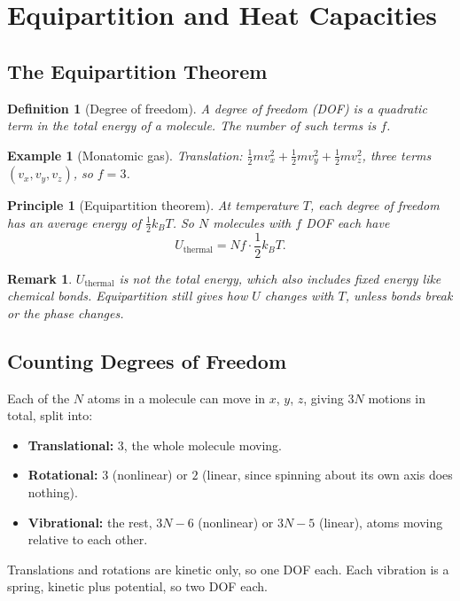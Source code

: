 \documentclass{article}
\newtheorem{principle}{Principle}
\newtheorem{definition}{Definition}
\newtheorem*{example}{Example}
\newtheorem{remark}{Remark}
\begin{document}
\section{Equipartition and Heat Capacities}

\subsection{The Equipartition Theorem}
\begin{definition}[Degree of freedom]
    A degree of freedom (DOF) is a quadratic term in the total energy of a molecule. The number of such terms is $f$.
\end{definition}
\begin{example}[Monatomic gas]
    Translation: $\tfrac{1}{2}mv_x^2 + \tfrac{1}{2}mv_y^2 + \tfrac{1}{2}mv_z^2$, three terms $(v_x,v_y,v_z)$, so $f = 3$.
\end{example}
\begin{principle}[Equipartition theorem]
    At temperature $T$, each degree of freedom has an average energy of $\tfrac{1}{2} k_B T$. So $N$ molecules with $f$ DOF each have
    \[U_{\text{thermal}} = N f \cdot \frac{1}{2} k_B T.\]
\end{principle}
\begin{remark}
    $U_{\text{thermal}}$ is not the total energy, which also includes fixed energy like chemical bonds. Equipartition still gives how $U$ changes with $T$, unless bonds break or the phase changes.
\end{remark}
\subsection{Counting Degrees of Freedom}
Each of the $N$ atoms in a molecule can move in $x$, $y$, $z$, giving $3N$ motions in total, split into:
\begin{itemize}
    \item \textbf{Translational:} $3$, the whole molecule moving.
    \item \textbf{Rotational:} $3$ (nonlinear) or $2$ (linear, since spinning about its own axis does nothing).
    \item \textbf{Vibrational:} the rest, $3N - 6$ (nonlinear) or $3N - 5$ (linear), atoms moving relative to each other.
\end{itemize}
Translations and rotations are kinetic only, so one DOF each. Each vibration is a spring, kinetic plus potential, so two DOF each.
\end{document}
